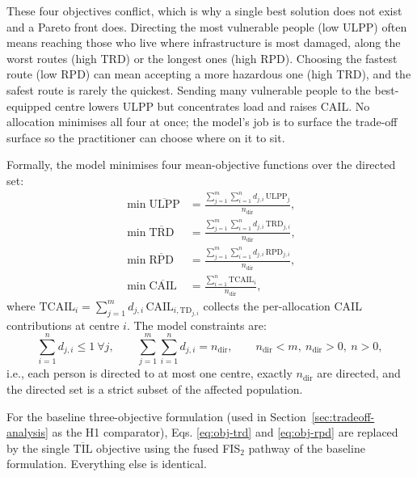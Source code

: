 \documentclass[applsci,article,submit,moreauthors,pdftex]{Definitions/mdpi}
\begin{document}
These four objectives conflict, which is why a single best solution does not
exist and a Pareto front does. Directing the most vulnerable people (low ULPP)
often means reaching those who live where infrastructure is most damaged, along
the worst routes (high TRD) or the longest ones (high RPD). Choosing the fastest
route (low RPD) can mean accepting a more hazardous one (high TRD), and the
safest route is rarely the quickest. Sending many vulnerable people to the
best-equipped centre lowers ULPP but concentrates load and raises CAIL. No
allocation minimises all four at once; the model's job is to surface the
trade-off surface so the practitioner can choose where on it to sit.

Formally, the model minimises four mean-objective functions over the directed set:
\begin{align}
    \min \overline{\mathrm{ULPP}} &= \frac{\sum_{j=1}^{m} \sum_{i=1}^{n} d_{j,i}\, \mathrm{ULPP}_j}
                                          {n_{\mathrm{dir}}}, \label{eq:obj-ulpp} \\
    \min \overline{\mathrm{TRD}} &= \frac{\sum_{j=1}^{m} \sum_{i=1}^{n} d_{j,i}\, \mathrm{TRD}_{j,i}}
                                          {n_{\mathrm{dir}}}, \label{eq:obj-trd} \\
    \min \overline{\mathrm{RPD}} &= \frac{\sum_{j=1}^{m} \sum_{i=1}^{n} d_{j,i}\, \mathrm{RPD}_{j,i}}
                                          {n_{\mathrm{dir}}}, \label{eq:obj-rpd} \\
    \min \overline{\mathrm{CAIL}} &= \frac{\sum_{i=1}^{n} \mathrm{TCAIL}_i}
                                          {n_{\mathrm{dir}}},   \label{eq:obj-cail}
\end{align}
where $\mathrm{TCAIL}_i = \sum_{j=1}^{m} d_{j,i}\, \mathrm{CAIL}_{i,\mathrm{TD}_{j,i}}$
collects the per-allocation CAIL contributions at centre $i$. The model
constraints are:
\begin{equation}
    \sum_{i=1}^{n} d_{j,i} \le 1\ \forall j, \qquad
    \sum_{j=1}^{m} \sum_{i=1}^{n} d_{j,i} = n_{\mathrm{dir}}, \qquad
    n_{\mathrm{dir}} < m,\ n_{\mathrm{dir}} > 0,\ n > 0,
\end{equation}
i.e., each person is directed to at most one centre, exactly
$n_{\mathrm{dir}}$ are directed, and the directed set is a strict subset of
the affected population.

For the baseline three-objective formulation (used in
Section~\ref{sec:tradeoff-analysis} as the H1 comparator), Eqs.
\eqref{eq:obj-trd} and \eqref{eq:obj-rpd} are replaced by the single
$\overline{\mathrm{TIL}}$ objective using the fused FIS$_2$ pathway of the
baseline formulation. Everything else is identical.
\end{document}
